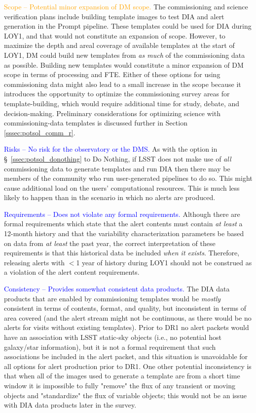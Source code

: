 \documentclass[DM,toc]{lsstdoc}
\begin{document}
\textcolor{orange}{ Scope -- Potential minor expansion of DM scope.}
The commissioning and science verification plans include building template images to test DIA and alert generation in the Prompt pipeline.
These templates could be used for DIA during LOY1, and that would not constitute an expansion of scope.
However, to maximize the depth and areal coverage of available templates at the start of LOY1, DM could build new templates from {\em as much} of the commissioning data as possible.
Building new templates would constitute a minor expansion of DM scope in terms of processing and FTE.
Either of these options for using commissioning data might also lead to a small increase in the scope because it introduces the opportunity to optimize the commissioning survey areas for template-building, which would require additional time for study, debate, and decision-making.
Preliminary considerations for optimizing science with commissioning-data templates is discussed further in Section \ref{sssec:potsol_comm_r}.

\textcolor{blue}{ Risks -- No risk for the observatory or the DMS.}
As with the option in \S~\ref{ssec:potsol_donothing} to Do Nothing, if LSST does not make use of {\em all} commissioning data to generate templates and run DIA then there may be members of the community who run user-generated pipelines to do so.
This might cause additional load on the users' computational resources.
This is much less likely to happen than in the scenario in which no alerts are produced.

\textcolor{blue}{ Requirements -- Does not violate any formal requirements.}
Although there are formal requirements which state that the alert contents must contain {\em at least} a 12-month history and that the variability characterization parameters be based on data from {\em at least} the past year, the correct interpretation of these requirements is that this historical data be included {\em when it exists}.
Therefore, releasing alerts with $<$1 year of history during LOY1 should not be construed as a violation of the alert content requirements.

\textcolor{blue}{ Consistency -- Provides somewhat consistent data products.}
The DIA data products that are enabled by commissioning templates would be {\em mostly} consistent in terms of contents, format, and quality, but inconsistent in terms of area covered (and the alert stream might not be continuous, as there would be no alerts for visits without existing templates).
Prior to DR1 no alert packets would have an association with LSST static-sky objects (i.e., no potential host galaxy/star information), but it is not a formal requirement that such associations be included in the alert packet, and this situation is unavoidable for all options for alert production prior to DR1.
One other potential inconsistency is that when all of the images used to generate a template are from a short time window it is impossible to fully "remove" the flux of any transient or moving objects and "standardize" the flux of variable objects; this would not be an issue with DIA data products later in the survey.
\end{document}
